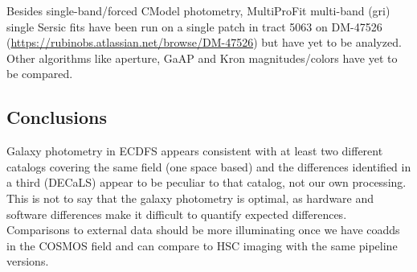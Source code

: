Besides single-band/forced CModel photometry, MultiProFit multi-band (gri) single Sersic fits have been run on a single patch in tract 5063 on DM-47526 (\url{https://rubinobs.atlassian.net/browse/DM-47526}) but have yet to be analyzed.
Other algorithms like aperture, GaAP and Kron magnitudes/colors have yet to be compared.

\subsection{Conclusions}
\label{subsec:galaxy_photometry_conclusions}

Galaxy photometry in ECDFS appears consistent with at least two different catalogs covering the same field (one space based) and the differences identified in a third (DECaLS) appear to be peculiar to that catalog, not our own processing.
This is not to say that the galaxy photometry is optimal, as hardware and software differences make it difficult to quantify expected differences.
Comparisons to external data should be more illuminating once we have coadds in the COSMOS field and can compare to HSC imaging with the same pipeline versions.